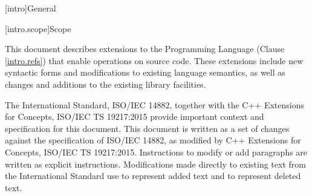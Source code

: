 
[intro]{General}

[intro.scope]{Scope}

\pnum
This document describes extensions to the \Cpp Programming
Language (Clause \ref{intro.refs}) that enable operations on source code. These
extensions include new syntactic forms and modifications to existing language
semantics, as well as changes and additions to the existing library facilities.

\pnum
The International Standard, ISO/IEC 14882, together with the C++ Extensions for
Concepts, ISO/IEC TS 19217:2015 provide important context and specification for
this document.  This document is written as a set of changes against the
specification of ISO/IEC 14882, as modified by C++ Extensions for Concepts,
ISO/IEC TS 19217:2015.  Instructions to modify or add paragraphs are written as
explicit instructions.  Modifications made directly to existing text from the
International Standard use  to represent added text and
 to represent deleted text.
